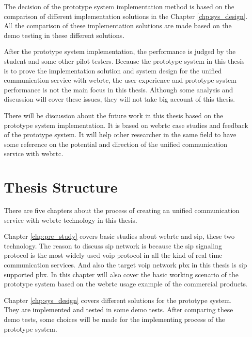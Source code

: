 \par The decision of the prototype system implementation method is based on the comparison of different implementation solutions in the Chapter \ref{chp:sys_design}. All the comparison of these implementation solutions are made based on the demo testing in these different solutions.

\par After the prototype system implementation, the performance is judged by the student and some other pilot testers. Because the prototype system in this thesis is to prove the implementation solution and system design for the unified communication service with \gls{webrtc}, the user experience and prototype system performance is not the main focus in this thesis. Although some analysis and discussion will cover these issues, they will not take big account of this thesis.

\par There will be discussion about the future work in this thesis based on the prototype system implementation. It is based on \gls{webrtc} case studies and feedback of the prototype system. It will help other researcher in the same field to have some reference on the potential and direction of the unified communication service with \gls{webrtc}.

\section{Thesis Structure}

\noindent There are five chapters about the process of creating an unified communication service with \gls{webrtc} technology in this thesis.

\par Chapter \ref{chp:pre_study} covers basic studies about \gls{webrtc} and \gls{sip}, these two technology. The reason to discuss \gls{sip} network is because the \gls{sip} signaling protocol is the most widely used \gls{voip} protocol in all the kind of real time communication services. And also the target \gls{voip} network \gls{pbx} in this thesis is \gls{sip} supported \gls{pbx}. In this chapter will also cover the basic working scenario of the prototype system based on the \gls{webrtc} usage example of the commercial products.

\par Chapter \ref{chp:sys_design} covers different solutions for the prototype system. They are implemented and tested in some demo tests. After comparing these demo tests, some choices will be made for the implementing process of the prototype system.

